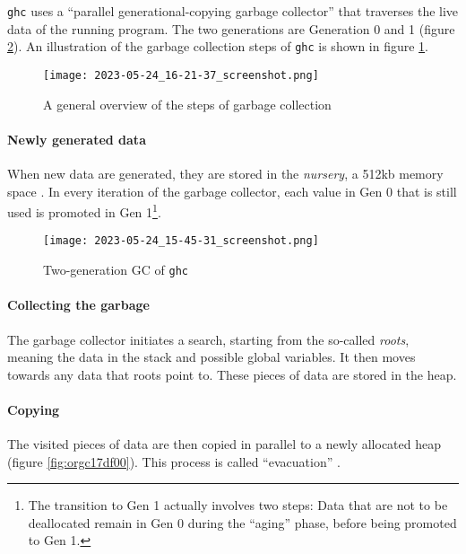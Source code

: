 \documentclass[a4paper, titlepage, twoside]{article}
\begin{document}
\texttt{ghc} uses a ``parallel generational-copying garbage collector'' \autocite{marlowParallelGenerationalcopyingGarbage2008} that traverses the live data of the running program. The two generations are Generation 0 and 1 (figure \ref{fig:org9c03d22}). An illustration of the garbage collection steps of \texttt{ghc} is shown in figure \ref{fig:org5ded579}.

\begin{figure}[htbp]
\centering
\texttt{[image: 2023-05-24\_16-21-37\_screenshot.png]}
\caption{\label{fig:org5ded579}A general overview of the steps of garbage collection \autocite{yangHowGrinchStole}}
\end{figure}

\paragraph*{Newly generated data}
\label{sec:orgc1ff2aa}

When new data are generated, they are stored in the \emph{nursery}, a 512kb memory space \autocite{haskellwikiHaskellHaskellWiki2023}. In every iteration of the garbage collector, each value in Gen 0 that is still used is promoted in Gen 1\footnote{The transition to Gen 1 actually involves two steps: Data that are not to be deallocated remain in Gen 0 during the ``aging'' phase, before being promoted to Gen 1.}.

\begin{figure}[htbp]
\centering
\texttt{[image: 2023-05-24\_15-45-31\_screenshot.png]}
\caption{\label{fig:org9c03d22}Two-generation GC of \texttt{ghc} \autocite{channableLessonsManagingHaskell}}
\end{figure}

\paragraph*{Collecting the garbage}
\label{sec:org41e5ec3}

The garbage collector initiates a search, starting from the so-called \emph{roots}, meaning the data in the stack and possible global variables. It then moves towards any data that roots point to. These pieces of data are stored in the heap.

\paragraph*{Copying}
\label{sec:org634224e}

The visited pieces of data are then copied in parallel to a newly allocated heap \autocite{marlowParallelGenerationalcopyingGarbage2008} (figure \ref{fig:orgc17df00}). This process is called ``evacuation'' \autocite{yangHowGrinchStole}.
\end{document}
